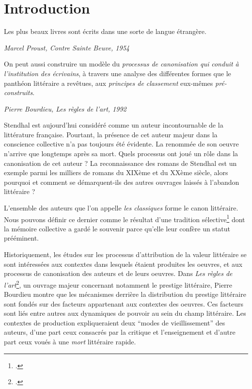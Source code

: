 \part*{Introduction}

\vspace*{\fill}
\epigraph{Les plus beaux livres sont écrits dans une sorte de langue étrangère.}{\textit{Marcel Proust, Contre Sainte Beuve, 1954}}
\epigraph{On peut aussi construire un modèle du \textit{processus de canonisation qui conduit à l'institution des écrivains}, à travers une analyse des différentes formes que le panthéon littéraire a revêtues, aux \textit{principes de classement} eux-mêmes \textit{pré-construits}.}{\textit{Pierre Bourdieu, Les règles de l'art, 1992}}

\vfill\clearpage

Stendhal est aujourd'hui considéré comme un auteur incontournable de la littérature française. Pourtant, la présence de cet auteur majeur dans la conscience collective n'a pas toujours été évidente. La renommée de son oeuvre n'arrive que longtemps après sa mort. Quels processus ont joué un rôle dans la canonisation de cet auteur ? La reconnaissance des romans de Stendhal est un exemple parmi les milliers de romans du XIXème et du XXème siècle, alors pourquoi et comment se démarquent-ils des autres ouvrages laissés à l'abandon littéraire ? 

L'ensemble des auteurs que l'on appelle \textit{les classiques} forme le canon littéraire. Nous pouvons définir ce dernier comme le résultat d'une tradition sélective\footcites{pollock_differencing_1999} dont la mémoire collective a gardé le souvenir parce qu’elle leur confère un statut prééminent.


Historiquement, les études sur les processus d'attribution de la valeur littéraire se sont intéressées aux contextes dans lesquels étaient produites les oeuvres, et aux processus de canonisation des auteurs et de leurs oeuvres. Dans \textit{Les règles de l'art}\footcites{bourdieu_les_1992}, un ouvrage majeur concernant notamment le prestige littéraire, Pierre Bourdieu montre que les mécanismes derrière la distribution du prestige littéraire sont fondés sur des facteurs appartenant aux contextes des oeuvres. Ces facteurs sont liés entre autres aux dynamiques de pouvoir au sein du champ littéraire. Les contextes de production expliqueraient deux \enquote{modes de vieillissement} des auteurs, d'une part ceux consacrés par la critique et l'enseignement et d'autre part ceux voués à une \textit{mort} littéraire rapide.

